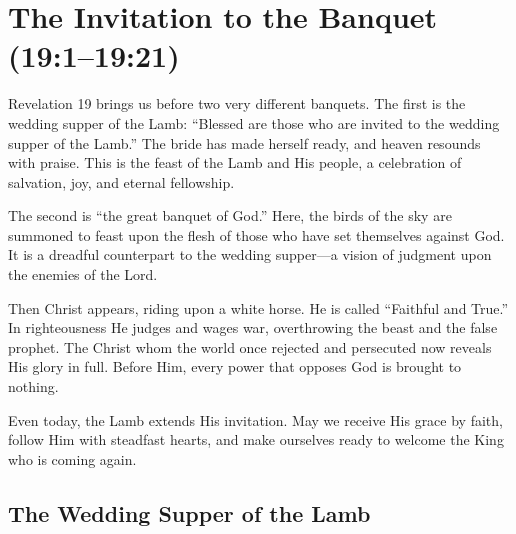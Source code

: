 \chapter{The Invitation to the Banquet (19:1--19:21)}

Revelation 19 brings us before two very different banquets. The first is the wedding supper of the Lamb: “Blessed are those who are invited to the wedding supper of the Lamb.” The bride has made herself ready, and heaven resounds with praise. This is the feast of the Lamb and His people, a celebration of salvation, joy, and eternal fellowship.

The second is “the great banquet of God.” Here, the birds of the sky are summoned to feast upon the flesh of those who have set themselves against God. It is a dreadful counterpart to the wedding supper—a vision of judgment upon the enemies of the Lord.

Then Christ appears, riding upon a white horse. He is called “Faithful and True.” In righteousness He judges and wages war, overthrowing the beast and the false prophet. The Christ whom the world once rejected and persecuted now reveals His glory in full. Before Him, every power that opposes God is brought to nothing.

Even today, the Lamb extends His invitation. May we receive His grace by faith, follow Him with steadfast hearts, and make ourselves ready to welcome the King who is coming again.

\section{The Wedding Supper of the Lamb}

